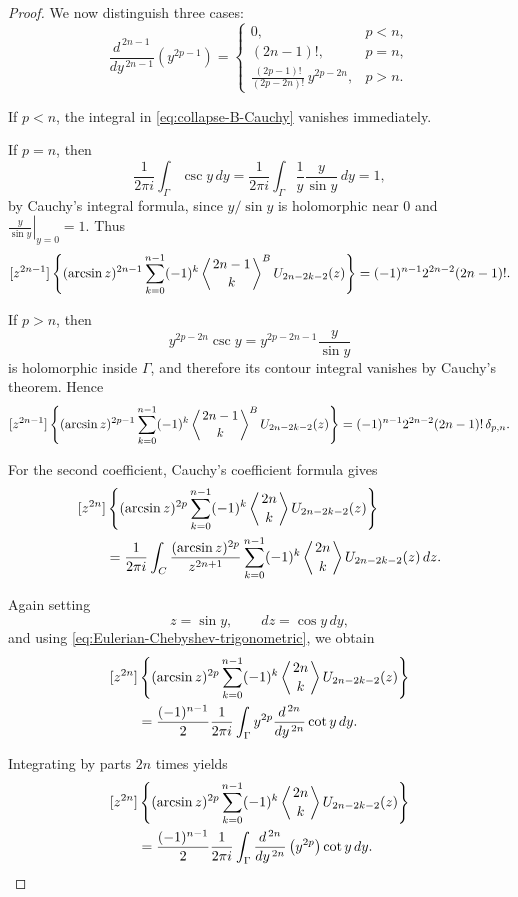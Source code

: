 \documentclass[10pt,a4paper]{amsart}
\begin{document}
\begin{proof}
We now distinguish three cases:
\[
\frac{d^{\,2n-1}}{dy^{\,2n-1}}
\left(y^{2p-1}\right)
=
\begin{cases}
0,
& p<n,
\\[1ex]
(2n-1)!,
& p=n,
\\[1ex]
\displaystyle
\frac{(2p-1)!}{(2p-2n)!}\,
y^{2p-2n},
& p>n.
\end{cases}
\]

If $p<n$, the integral in
\cref{eq:collapse-B-Cauchy} vanishes immediately.

If $p=n$, then
\[
\frac{1}{2\pi i}
\int_{\Gamma}\csc y\,dy
=
\frac{1}{2\pi i}
\int_{\Gamma}
\frac{1}{y}\frac{y}{\sin y}\,dy
=1,
\]
by Cauchy's integral formula, since $y/\sin y$ is holomorphic
near $0$ and \(\displaystyle\left.\frac{y}{\sin y}\right|_{y=0}=1.\)
Thus
\[
[z^{2n-1}]\left\{
(\arcsin z)^{2n-1}
\sum_{k=0}^{n-1}
(-1)^k
\left\langle {2n-1\atop k}\right\rangle^{B}
U_{2n-2k-2}(z)\right\}
=
(-1)^{n-1}2^{2n-2}(2n-1)!.
\]

If $p>n$, then
\[
y^{2p-2n}\csc y
=
y^{2p-2n-1}\frac{y}{\sin y}
\]
is holomorphic inside $\Gamma$, and therefore its contour integral
vanishes by Cauchy's theorem. Hence
\[
[z^{2n-1}]\left\{
(\arcsin z)^{2p-1}
\sum_{k=0}^{n-1}
(-1)^k
\left\langle {2n-1\atop k}\right\rangle^{B}
U_{2n-2k-2}(z)\right\}
=
(-1)^{n-1}2^{2n-2}(2n-1)!\,\delta_{p,n}.
\]

For the second coefficient, Cauchy's coefficient formula gives
\begin{align*}
&[z^{2n}]\left\{
(\arcsin z)^{2p}
\sum_{k=0}^{n-1}
(-1)^k
\left\langle {2n\atop k}\right\rangle
U_{2n-2k-2}(z)\right\}
\\
&\qquad=
\frac{1}{2\pi i}
\int_C
\frac{(\arcsin z)^{2p}}{z^{2n+1}}
\sum_{k=0}^{n-1}
(-1)^k
\left\langle {2n\atop k}\right\rangle
U_{2n-2k-2}(z)\,dz.
\end{align*}

Again setting
\[
z=\sin y,
\qquad
dz=\cos y\,dy,
\]
and using
\cref{eq:Eulerian-Chebyshev-trigonometric}, we obtain
\begin{align*}
&[z^{2n}]\left\{
(\arcsin z)^{2p}
\sum_{k=0}^{n-1}
(-1)^k
\left\langle {2n\atop k}\right\rangle
U_{2n-2k-2}(z)\right\}
\\
&\qquad=
\frac{(-1)^{n-1}}{2}
\frac{1}{2\pi i}
\int_{\Gamma}
y^{2p}
\frac{d^{\,2n}}{dy^{\,2n}}\cot y\,dy.
\end{align*}

Integrating by parts $2n$ times yields
\begin{align}
&[z^{2n}]\left\{
(\arcsin z)^{2p}
\sum_{k=0}^{n-1}
(-1)^k
\left\langle {2n\atop k}\right\rangle
U_{2n-2k-2}(z)\right\}
\nonumber\\
&\qquad=
\frac{(-1)^{n-1}}{2}
\frac{1}{2\pi i}
\int_{\Gamma}
\frac{d^{\,2n}}{dy^{\,2n}}
\left(y^{2p}\right)
\cot y\,dy.
\label{eq:collapse-A-Cauchy}
\end{align}


\end{proof}
\end{document}
